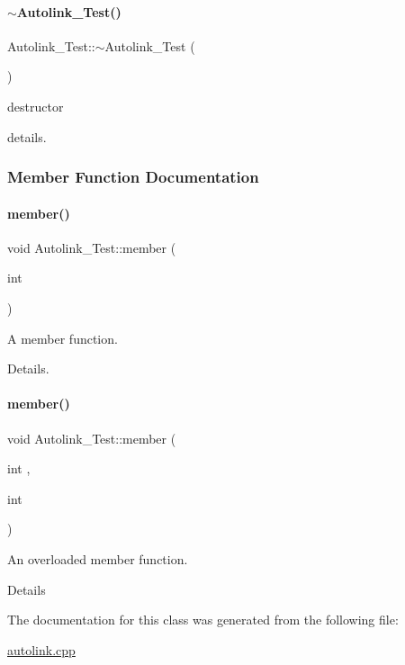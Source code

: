 \paragraph{\texorpdfstring{$\sim$\+Autolink\+\_\+\+Test()}{~Autolink\_Test()}}
{\footnotesize\ttfamily Autolink\+\_\+\+Test\+::$\sim$\+Autolink\+\_\+\+Test (\begin{DoxyParamCaption}{ }\end{DoxyParamCaption})}



destructor 

details. 

\subsubsection{Member Function Documentation}
\mbox{\label{class_autolink___test_a393ea281f235a2f603d98daf72b0d411}} 
\paragraph{\texorpdfstring{member()}{member()}\hspace{0.1cm}{\footnotesize\ttfamily [1/2]}}
{\footnotesize\ttfamily void Autolink\+\_\+\+Test\+::member (\begin{DoxyParamCaption}\item[{int}]{ }\end{DoxyParamCaption})}



A member function. 

Details. \mbox{\label{class_autolink___test_acf783a43c2b4b6cc9dd2361784eca2e1}} 
\paragraph{\texorpdfstring{member()}{member()}\hspace{0.1cm}{\footnotesize\ttfamily [2/2]}}
{\footnotesize\ttfamily void Autolink\+\_\+\+Test\+::member (\begin{DoxyParamCaption}\item[{int}]{,  }\item[{int}]{ }\end{DoxyParamCaption})}



An overloaded member function. 

Details 

The documentation for this class was generated from the following file\+:\begin{DoxyCompactItemize}
\item 
\hyperlink{autolink_8cpp}{autolink.\+cpp}\end{DoxyCompactItemize}
